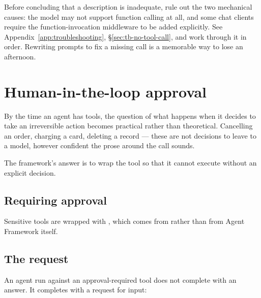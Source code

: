 \begin{warning}
Before concluding that a description is inadequate, rule out the two mechanical
causes: the model may not support function calling at all, and some chat clients
require the function-invocation middleware to be added explicitly. See
Appendix~\ref{app:troubleshooting}, \S\ref{sec:tb-no-tool-call}, and work through
it in order. Rewriting prompts to fix a missing  call
is a memorable way to lose an afternoon.
\end{warning}

\section{Human-in-the-loop approval}
\label{sec:approvals}

By the time an agent has tools, the question of what happens when it decides to
take an irreversible action becomes practical rather than theoretical. Cancelling
an order, charging a card, deleting a record --- these are not decisions to leave
to a model, however confident the prose around the call sounds.

The framework's answer is to wrap the tool so that it cannot execute without an
explicit decision.

\subsection{Requiring approval}

Sensitive tools are wrapped with , which comes
from  rather than from Agent Framework itself.

\subsection{The request}

An agent run against an approval-required tool does not complete with an answer.
It completes with a request for input:


